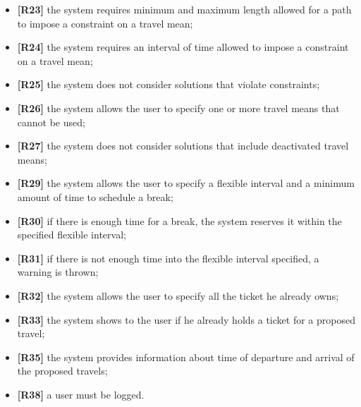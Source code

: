 \begin{itemize}
	\item \textbf{[R23]} the system requires minimum and maximum length allowed for a path to impose a constraint on a travel mean;
	\item \textbf{[R24]} the system requires an interval of time allowed to impose a constraint on a travel mean;
	\item \textbf{[R25]} the system does not consider solutions that violate constraints;
	\item \textbf{[R26]} the system allows the user to specify one or more travel means that cannot be used;
	\item \textbf{[R27]} the system does not consider solutions that include deactivated travel means; 
	\item \textbf{[R29]} the system allows the user to specify a flexible interval and a minimum amount of time to schedule a break;
	\item \textbf{[R30]} if there is enough time for a break, the system reserves it within the specified flexible interval;
	\item \textbf{[R31]} if there is not enough time into the flexible interval specified, a warning is thrown;
	\item \textbf{[R32]} the system allows the user to specify all the ticket he already owns;
	\item \textbf{[R33]} the system shows to the user if he already holds a ticket for a proposed travel;
	\item \textbf{[R35]} the system provides information about time of departure and arrival of the proposed travels;
	\item \textbf{[R38]} a user must be logged. 
\end{itemize}

